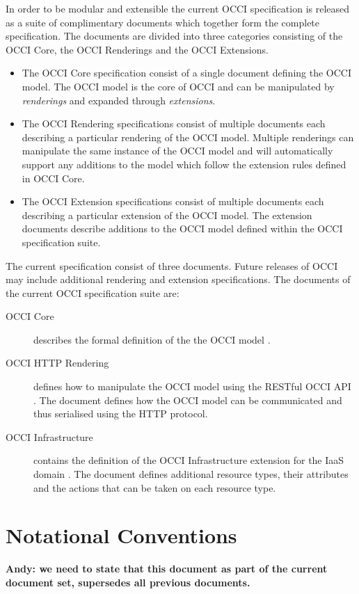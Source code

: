 \documentclass[10pt,a4paper]{article}
\begin{document}
In order to be modular and extensible the current OCCI specification is
released as a suite of complimentary documents which together form the complete
specification.
%
The documents are divided into three categories consisting of the OCCI Core,
the OCCI Renderings and the OCCI Extensions.
%
\begin{itemize}
\item The OCCI Core specification consist of a single document defining the
 OCCI model. The OCCI model is the core of OCCI and can be manipulated by {\em
 renderings} and expanded through {\em extensions}.
\item The OCCI Rendering specifications consist of multiple documents each
 describing a particular rendering of the OCCI model. Multiple renderings can
 manipulate the same instance of the OCCI model and will automatically support
 any additions to the model which follow the extension rules defined in OCCI
 Core.
\item The OCCI Extension specifications consist of multiple documents each
 describing a particular extension of the OCCI model. The extension documents
 describe additions to the OCCI model defined within the OCCI specification
 suite.
\end{itemize}
%
The current specification consist of three documents.
Future releases of OCCI may include additional rendering and extension
specifications. The documents of the current OCCI specification suite are:

\begin{description}
\item[OCCI Core] describes the formal definition of the the OCCI model
\cite{occi:core}.
\item[OCCI HTTP Rendering] defines how to manipulate the OCCI model using the
RESTful OCCI API \cite{occi:http_rendering}. The document defines how the OCCI model can
be communicated and thus serialised using the HTTP protocol.
\item[OCCI Infrastructure] contains the definition of the OCCI Infrastructure
extension for the IaaS domain \cite{occi:infrastructure}. The document defines
additional resource types, their attributes and the actions that can be taken
on each resource type.
\end{description}


\section{Notational Conventions}

\textbf{Andy: we need to state that this document as part of the current document set,
supersedes all previous documents.}
\end{document}

